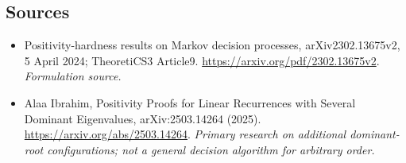\documentclass[11pt]{article}
\begin{document}
\subsection{Sources}
\begin{itemize}
\item[S1]Positivity-hardness results on Markov decision processes, arXiv2302.13675v2, 5 April 2024; TheoretiCS3 Article9.
\url{https://arxiv.org/pdf/2302.13675v2}.
\textit{Formulation source.}
\item[E1]Alaa Ibrahim, Positivity Proofs for Linear Recurrences with Several Dominant Eigenvalues, arXiv:2503.14264 (2025).
\url{https://arxiv.org/abs/2503.14264}.
\textit{Primary research on additional dominant-root configurations; not a general decision algorithm for arbitrary order.}
\end{itemize}
\end{document}
